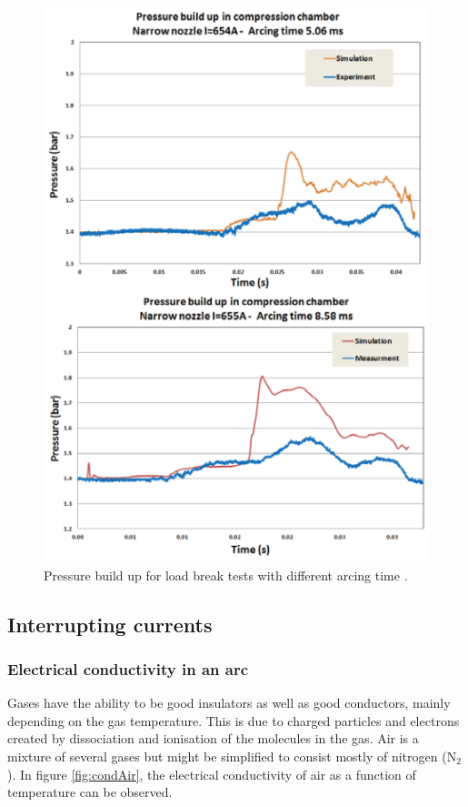 \documentclass[10pt,a4paper,twoside]{article}
\begin{document}
\begin{figure} [H]
\centering
\includegraphics[scale=0.5]{Bilder/Theory/tankPressure2.png}
\caption{Pressure build up for load break tests with different arcing time   \cite{bib:CBAC}.} \label{fig:airPressurePuffer2}
\end{figure}

\subsection{Interrupting currents}
\subsubsection{Electrical conductivity in an arc} \label{sec:eleCondArc}
Gases have the ability to be good insulators as well as good conductors, mainly depending on the gas temperature. This is due to charged particles and electrons created by dissociation and ionisation of the molecules in the gas. Air is a mixture of several gases but might be simplified to consist mostly of nitrogen (N$_2$). In figure \ref{fig:condAir}, the electrical conductivity of air as a function of temperature can be observed.
\end{document}
